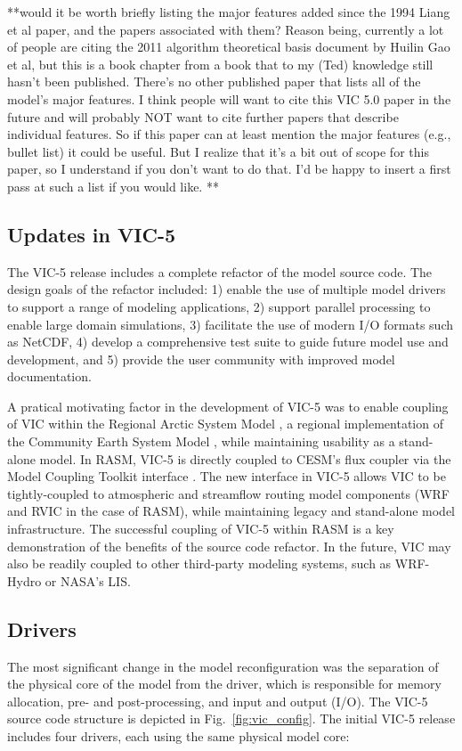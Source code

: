 \documentclass[gmd, manuscript]{copernicus}
\begin{document}
**would it be worth briefly listing the major features added since the 1994 Liang et al paper, and the papers associated with them?  Reason being, currently a lot of people are citing the 2011 algorithm theoretical basis document by Huilin Gao et al, but this is a book chapter from a book that to my (Ted) knowledge still hasn't been published.  There's no other published paper that lists all of the model's major features.  I think people will want to cite this VIC 5.0 paper in the future and will probably NOT want to cite further papers that describe individual features.  So if this paper can at least mention the major features (e.g., bullet list) it could be useful.  But I realize that it's a bit out of scope for this paper, so I understand if you don't want to do that.  I'd be happy to insert a first pass at such a list if you would like.  **

  \subsection{Updates in VIC-5}
    \label{sec:vic-5}
    The VIC-5 release includes a complete refactor of the model source code. The design goals of the refactor included: 1) enable the use of multiple model drivers to support a range of modeling applications, 2) support parallel processing to enable large domain simulations, 3) facilitate the use of modern I/O formats such as NetCDF, 4) develop a comprehensive test suite to guide future model use and development, and 5) provide the user community with improved model documentation.

    A pratical motivating factor in the development of VIC-5 was to enable coupling of VIC within the Regional Arctic System Model \citep[RASM;][]{Hamman_2016a}, a regional implementation of the Community Earth System Model \citep[CESM;][]{Hurrell_2013}, while maintaining usability as a stand-alone model. In RASM, VIC-5 is directly coupled to CESM's flux coupler \citep[CPL7;][]{Craig_2012} via the Model Coupling Toolkit interface \citep[MCT;][]{Larson_2005}. The new interface in VIC-5 allows VIC to be tightly-coupled to atmospheric and streamflow routing model components (WRF and RVIC in the case of RASM), while maintaining legacy and stand-alone model infrastructure. The successful coupling of VIC-5 within RASM is a key demonstration of the benefits of the source code refactor. In the future, VIC may also be readily coupled to other third-party modeling systems, such as WRF-Hydro or NASA's LIS.

  \subsection{Drivers}
    \label{sec:drivers}
    The most significant change in the model reconfiguration was the separation of the physical core of the model from the driver, which is responsible for memory allocation, pre- and post-processing, and input and output (I/O). The VIC-5 source code structure is depicted in Fig.~\ref{fig:vic_config}. The initial VIC-5 release includes four drivers, each using the same physical model core:
\end{document}
